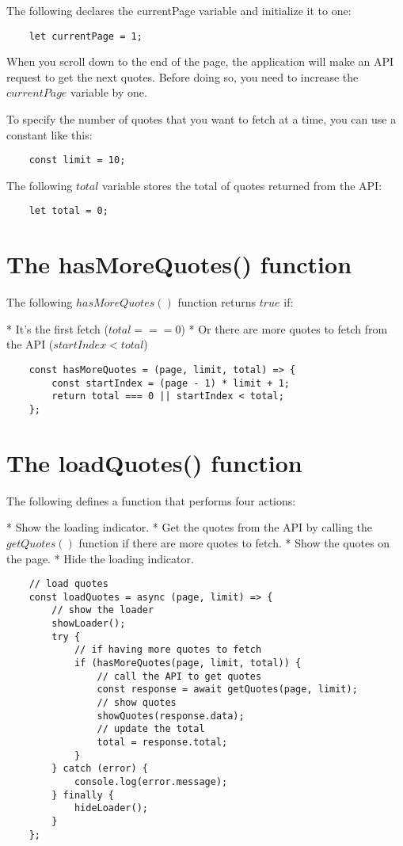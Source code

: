 \documentclass[11pt]{article}
\begin{document}
The following declares the currentPage variable and initialize it to one:

\begin{lstlisting}
    let currentPage = 1;
\end{lstlisting}

When you scroll down to the end of the page, the application will make
an API request to get the next quotes. Before doing so, you need to
increase the $currentPage$ variable by one.

To specify the number of quotes that you want to fetch at a time,
you can use a constant like this:

\begin{lstlisting}
    const limit = 10;
\end{lstlisting}

The following $total$ variable stores the total of quotes
returned from the API:

\begin{lstlisting}
    let total = 0;
\end{lstlisting}

\section*{The hasMoreQuotes() function}

The following $hasMoreQuotes()$ function returns $true$ if:

* It's the first fetch ($total === 0$)
* Or there are more quotes to fetch from the API ($startIndex < total$)

\begin{lstlisting}
    const hasMoreQuotes = (page, limit, total) => {
        const startIndex = (page - 1) * limit + 1;
        return total === 0 || startIndex < total;
    };
\end{lstlisting}

\section*{The loadQuotes() function}

The following defines a function that performs four actions:

* Show the loading indicator.
* Get the quotes from the API by calling the $getQuotes()$ function
if there are more quotes to fetch.
* Show the quotes on the page.
* Hide the loading indicator.

\begin{lstlisting}
    // load quotes
    const loadQuotes = async (page, limit) => {
        // show the loader
        showLoader();
        try {
            // if having more quotes to fetch
            if (hasMoreQuotes(page, limit, total)) {
                // call the API to get quotes
                const response = await getQuotes(page, limit);
                // show quotes
                showQuotes(response.data);
                // update the total
                total = response.total;
            }
        } catch (error) {
            console.log(error.message);
        } finally {
            hideLoader();
        }
    };
\end{lstlisting}
\end{document}
